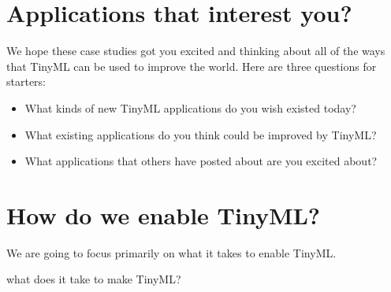 \section{Applications that interest you?}


We hope these case studies got you excited and thinking about all of the ways that TinyML can be used to improve the world.  Here are three questions for starters: 

\begin{itemize}
  \item What kinds of new TinyML applications do you wish existed today?
  \item What existing applications do you think could be improved by TinyML?
  \item What applications that others have posted about are you excited about?
\end{itemize}




\section{How do we enable TinyML?}


We are  going to focus primarily on what it takes to enable TinyML.

 what does it take to make TinyML?
 

